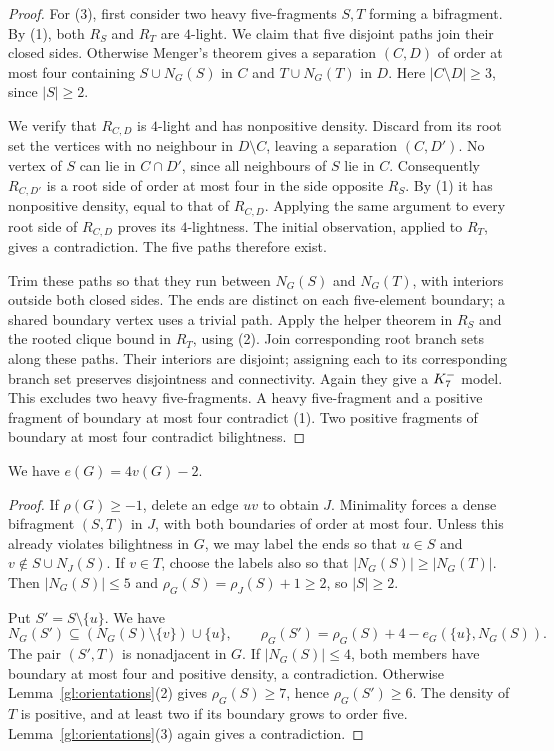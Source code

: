 \begin{proof}
For (3), first consider two heavy five-fragments $S,T$ forming a
bifragment. By (1), both $R_S$ and $R_T$ are $4$-light. We claim that
five disjoint paths join their closed sides. Otherwise
Menger's theorem gives a separation $(C,D)$ of order at most four
containing $S\cup N_G(S)$ in $C$ and $T\cup N_G(T)$ in $D$.
Here $|C\setminus D|\geq3$, since $|S|\geq2$.

We verify that $R_{C,D}$ is $4$-light and has nonpositive density.
Discard from its root set the vertices with no neighbour in
$D\setminus C$, leaving a separation $(C,D')$. No vertex of $S$
can lie in $C\cap D'$, since all neighbours of $S$ lie in $C$.
Consequently $R_{C,D'}$ is a root side of order at most four in the
side opposite $R_S$. By (1) it has nonpositive density, equal to
that of $R_{C,D}$. Applying the same argument to every root side of
$R_{C,D}$ proves its $4$-lightness. The initial observation, applied
to $R_T$, gives a contradiction. The five paths therefore exist.

Trim these paths so that they run between $N_G(S)$ and $N_G(T)$,
with interiors outside both closed sides. The ends are distinct on
each five-element boundary; a shared boundary vertex uses a trivial
path. Apply the helper theorem in $R_S$ and the rooted clique bound
in $R_T$, using (2). Join corresponding root branch sets along these
paths. Their interiors are disjoint; assigning each to its corresponding
branch set preserves disjointness and connectivity. Again they give a
$K_7^{-}$ model.
This excludes two heavy five-fragments. A heavy five-fragment and a
positive fragment of boundary at most four contradict (1). Two
positive fragments of boundary at most four contradict bilightness.
\end{proof}

\begin{lemma}\label{gl:exact-density}
We have $e(G)=4v(G)-2$.
\end{lemma}

\begin{proof}
If $\rho(G)\geq-1$, delete an edge $uv$ to obtain $J$. Minimality
forces a dense bifragment $(S,T)$ in $J$, with both boundaries of
order at most four. Unless this already violates bilightness in $G$,
we may label the ends so that $u\in S$ and
$v\notin S\cup N_J(S)$. If $v\in T$, choose the labels also so that
$|N_G(S)|\geq|N_G(T)|$. Then $|N_G(S)|\leq5$ and
$\rho_G(S)=\rho_J(S)+1\geq2$, so $|S|\geq2$.

Put $S'=S\setminus\{u\}$. We have
\[
 N_G(S')\subseteq(N_G(S)\setminus\{v\})\cup\{u\},\qquad
 \rho_G(S')=\rho_G(S)+4-e_G(\{u\},N_G(S)).
\]
The pair $(S',T)$ is nonadjacent in $G$. If $|N_G(S)|\leq4$, both
members have boundary at most four and positive density, a
contradiction. Otherwise Lemma~\ref{gl:orientations}(2) gives
$\rho_G(S)\geq7$, hence $\rho_G(S')\geq6$. The density of $T$ is
positive, and at least two if its boundary grows to order five.
Lemma~\ref{gl:orientations}(3) again gives a contradiction.
\end{proof}

